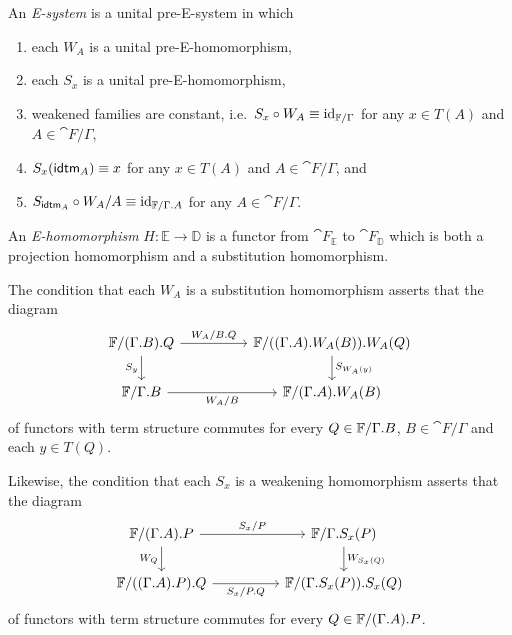 \begin{defn}
\label{defn:esystems}
An \emph{E-system} is a unital pre-E-system in which 
\begin{enumerate}
\item each $W_A$ is a unital pre-E-homomorphism,
\item each $S_x$ is a unital pre-E-homomorphism,
\item \label{tTf:StWf_id} weakened families are constant, i.e.~$S_x\circ W_A\equiv {\mathrm{id}_{\mathbb{F}/\Gamma}}$ for any $x\in T(A)$ and $A\in\cat{F}/\Gamma$,
\item $S_x(\tfid{A})\jdeq x$ for any $x\in T(A)$ and $A\in\cat{F}/\Gamma$, and
\item \label{f:SidfWff_id} $S_{\tfid{A}}\circ W_A/A\jdeq \catid{\cat{F}/\ctxext{\Gamma}{A}}$ for any $A\in\cat{F}/\Gamma$.
\end{enumerate}
An \emph{E-homomorphism} $H:\mathbb{E}\to\mathbb{D}$ is a functor from
$\cat{F}_{\mathbb{E}}$ to $\cat{F}_{\mathbb{D}}$ which is both a projection
homomorphism and a substitution homomorphism.
\end{defn}

\begin{rmk}
The condition that each $W_A$ is a substitution homomorphism asserts that
the diagram
\begin{equation*}
\begin{tikzcd}[column sep=huge]
\cat{F}/\ctxext{{\Gamma}{B}}{Q}
  \arrow[r,"W_A/\ctxext{B}{Q}"]
  \arrow[d,swap,"S_y"]
  &
\cat{F}/\ctxext{{{\Gamma}{A}}{W_A(B)}}{W_A(Q)}
  \arrow[d,"S_{W_A(y)}"]
  \\
\cat{F}/\ctxext{\Gamma}{B}
  \arrow[r,swap,"W_A/B"]
  &
\cat{F}/\ctxext{{\Gamma}{A}}{W_A(B)}
\end{tikzcd}
\end{equation*}
of functors with term structure commutes for every 
$Q\in\cat{F}/\ctxext{\Gamma}{B}$, $B\in\cat{F}/\Gamma$ and each $y\in T(Q)$.

Likewise, the condition that each $S_x$ is a weakening homomorphism
asserts that the diagram
\begin{equation*}
\begin{tikzcd}[column sep=huge]
\cat{F}/\ctxext{{\Gamma}{A}}{P}
  \arrow[r,"S_x/P"]
  \arrow[d,swap,"W_Q"]
  &
\cat{F}/\ctxext{\Gamma}{S_x(P)}
  \arrow[d,"W_{S_x(Q)}"]
  \\
\cat{F}/\ctxext{{{\Gamma}{A}}{P}}{Q}
  \arrow[r,swap,"S_x/\ctxext{P}{Q}"]
  &
\cat{F}/\ctxext{{\Gamma}{S_x(P)}}{S_x(Q)}
\end{tikzcd}
\end{equation*}
of functors with term structure commutes for every 
$Q\in\cat{F}/\ctxext{{\Gamma}{A}}{P}$.
\end{rmk}

